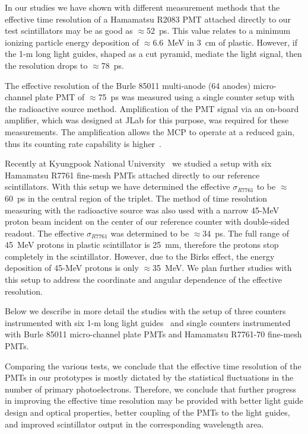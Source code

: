 In our studies we have shown with different measurement methods
\cite{Baturin:2005,r1,barb06} that the effective time resolution of a 
Hamamatsu R2083 PMT attached directly to our test scintillators may be as 
good as $\approx$52~ps.  This value relates to a minimum ionizing particle 
energy deposition of $\approx$6.6~MeV in 3~cm of plastic.  However, if the 
1-m long light guides, shaped as a cut pyramid, mediate the light signal, 
then the resolution drops to $\approx$78~ps. 

The effective resolution of the Burle 85011 multi-anode (64 anodes) 
micro-channel plate PMT of $\approx$75~ps was measured using a single 
counter setup with the radioactive source method.  Amplification of the
PMT signal via an on-board amplifier, which was designed at JLab for 
this purpose, was required for these measurements.  The amplification 
allows the MCP to operate at a reduced gain, thus its counting rate 
capability is higher~\cite{Baturin:2005}.

Recently at Kyungpook National University~\cite{kuznetsov} we studied
a setup with six Hamamatsu R7761 fine-mesh PMTs attached directly to our 
reference scintillators.  With this setup we have determined the effective 
$\sigma_{R7761}$ to be $\approx$60~ps in the central region of the triplet.   
The method of time resolution measuring with the radioactive source was also 
used with a narrow 45-MeV proton beam incident on the center of our reference 
counter with double-sided readout.  The effective $\sigma_{R7761}$ was 
determined to be $\approx$34~ps. The full range of 45~MeV protons in plastic 
scintillator is 25~mm, therefore the protons stop completely in the scintillator.
However, due to the Birks effect, the energy deposition of 45-MeV protons is 
only $\approx$35~MeV.  We plan further studies with this setup to address the 
coordinate and angular dependence of the effective resolution.

Below we describe in more detail the studies with the setup of three counters
instrumented with six 1-m long light guides~\cite{llg} and single counters 
instrumented with Burle 85011 micro-channel plate PMTs and Hamamatsu R7761-70 
fine-mesh PMTs.

Comparing the various tests, we conclude that the effective time resolution of 
the PMTs in our prototypes is mostly dictated by the statistical fluctuations  
in the number of primary photoelectrons.  Therefore, we conclude that further 
progress in improving the effective time resolution may be provided with 
better light guide design and optical properties, better coupling of the PMTs 
to the light guides, and improved scintillator output in the corresponding 
wavelength area.

